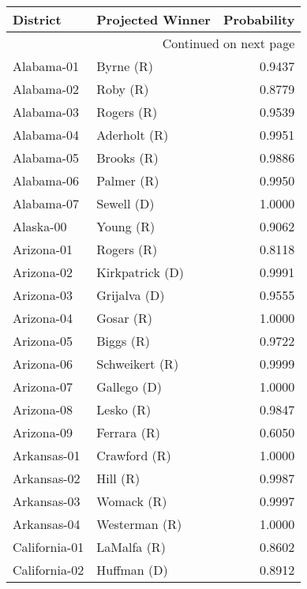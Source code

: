 \begin{longtable}{llr}
\toprule
          District &     Projected Winner &  Probability \\
\midrule
\endhead
\midrule
\multicolumn{3}{r}{{Continued on next page}} \\
\midrule
\endfoot

\bottomrule
\endlastfoot
        Alabama-01 &            Byrne (R) &       0.9437 \\
        Alabama-02 &             Roby (R) &       0.8779 \\
        Alabama-03 &           Rogers (R) &       0.9539 \\
        Alabama-04 &         Aderholt (R) &       0.9951 \\
        Alabama-05 &           Brooks (R) &       0.9886 \\
        Alabama-06 &           Palmer (R) &       0.9950 \\
        Alabama-07 &           Sewell (D) &       1.0000 \\
         Alaska-00 &            Young (R) &       0.9062 \\
        Arizona-01 &           Rogers (R) &       0.8118 \\
        Arizona-02 &      Kirkpatrick (D) &       0.9991 \\
        Arizona-03 &         Grijalva (D) &       0.9555 \\
        Arizona-04 &            Gosar (R) &       1.0000 \\
        Arizona-05 &            Biggs (R) &       0.9722 \\
        Arizona-06 &       Schweikert (R) &       0.9999 \\
        Arizona-07 &          Gallego (D) &       1.0000 \\
        Arizona-08 &            Lesko (R) &       0.9847 \\
        Arizona-09 &          Ferrara (R) &       0.6050 \\
       Arkansas-01 &         Crawford (R) &       1.0000 \\
       Arkansas-02 &             Hill (R) &       0.9987 \\
       Arkansas-03 &           Womack (R) &       0.9997 \\
       Arkansas-04 &        Westerman (R) &       1.0000 \\
     California-01 &          LaMalfa (R) &       0.8602 \\
     California-02 &          Huffman (D) &       0.8912 \\

\end{longtable}

